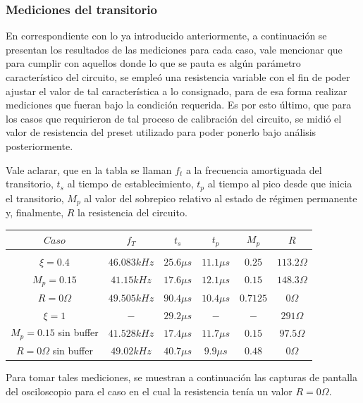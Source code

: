 \subsubsection{Mediciones del transitorio}
En correspondiente con lo ya introducido anteriormente, a continuaci\'on se presentan los resultados de las mediciones para cada caso, vale mencionar que para cumplir con aquellos donde lo que se pauta
es alg\'un par\'ametro caracter\'istico del circuito, se emple\'o una resistencia variable con el fin de poder ajustar el valor de tal caracter\'istica a lo consignado, para de esa forma realizar mediciones que 
fueran bajo la condici\'on requerida. Es por esto \'ultimo, que para los casos que requirieron de tal proceso de calibraci\'on del circuito, se midi\'o el valor de resistencia del preset utilizado para 
poder ponerlo bajo an\'alisis posteriormente.

Vale aclarar, que en la tabla se llaman $f_t$ a la frecuencia amortiguada del transitorio, $t_s$ al tiempo de establecimiento, $t_p$ al tiempo al pico desde que inicia el transitorio, 
$M_p$ al valor del sobrepico relativo al estado de r\'egimen permanente y, finalmente, $R$ la resistencia del circuito.

\begin{table}[H]
    \centering
    \begin{tabular}{c c c c c c}
        $Caso$ & $f_T$ & $t_s$ & $t_p$ & $M_p$ & $R$ \\
        \hline \\
        $\xi = 0.4$ & $46.083kHz$ & $25.6\mu s$ & $11.1\mu s$ & $0.25$ & $113.2 \Omega$ \\
        $M_p = 0.15$ & $41.15kHz$ & $17.6 \mu s$ & $12.1\mu s$ & $0.15$ & $148.3 \Omega$ \\
        $R = 0\Omega$ & $49.505kHz$ & $90.4 \mu s$ & $10.4 \mu s$ & $0.7125$ & $0 \Omega$ \\
        $\xi = 1$ & $-$ & $29.2 \mu s$ & $-$ & $-$ & $291 \Omega$ \\
        $M_p = 0.15$ sin buffer & $41.528kHz$ & $17.4 \mu s$ & $11.7 \mu s$ & $0.15$ & $97.5 \Omega$ \\
        $R = 0\Omega$ sin buffer & $49.02kHz$ & $40.7 \mu s$ & $9.9 \mu s$ & $0.48$ & $0 \Omega$ \\
        \hline
    \end{tabular}
\end{table}

Para tomar tales mediciones, se muestran a continuaci\'on las capturas de pantalla del osciloscopio para el caso
en el cual la resistencia ten\'ia un valor $R = 0 \Omega$.

